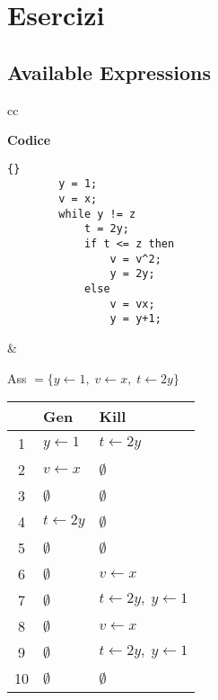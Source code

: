 \documentclass[a4paper,12pt,openany]{article}
\begin{document}
    \newpage
    \clearpage\section*{Esercizi}
    \subsection*{Available Expressions}
    \begin{tabular}{cc}
    \begin{minipage}{0.5\textwidth}
    \textbf{Codice}
    \begin{lstlisting}{}
        y = 1;
        v = x;
        while y != z
            t = 2y;
            if t <= z then
                v = v^2;
                y = 2y;
            else
                v = vx;
                y = y+1;
    \end{lstlisting}
    \end{minipage}&
    
    \noindent
    \begin{minipage}{0.5\textwidth}
    Ass $= \{y\leftarrow1,\;v\leftarrow x,\;t\leftarrow2y\}$\\[0.5em]
    \begin{tabular}{c | l | l}
        & Gen & Kill\\
        \hline
        1  & $y\leftarrow1$ & $t\leftarrow2y$\\
        2  & $v\leftarrow x$ & $\emptyset$\\
        3  & $\emptyset$ & $\emptyset$\\
        4  & $t\leftarrow2y$ & $\emptyset$\\
        5  & $\emptyset$ & $\emptyset$\\
        6  & $\emptyset$ & $v\leftarrow x$\\
        7  & $\emptyset$ & $t\leftarrow2y,\; y\leftarrow1$\\
        8  & $\emptyset$ & $v\leftarrow x$\\
        9  & $\emptyset$ & $t\leftarrow2y,\; y\leftarrow1$\\
        10 & $\emptyset$ & $\emptyset$\\
    \end{tabular}
    \end{minipage}
    \end{tabular}
\end{document}
